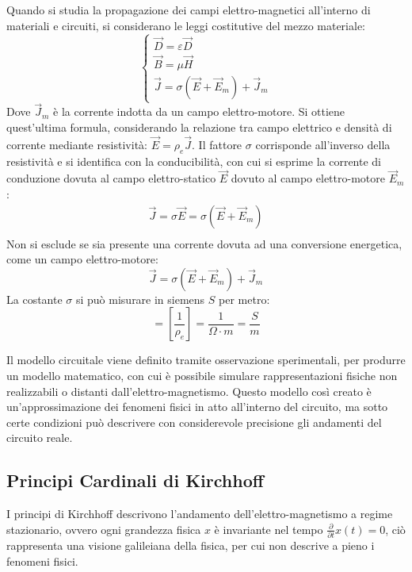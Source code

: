 \documentclass{article}
\numberwithin{equation}{subsection}
\begin{document}
Quando si studia la propagazione dei campi elettro-magnetici all'interno di materiali e circuiti, si considerano le leggi costitutive del mezzo materiale:
\begin{equation}
    \begin{cases}
        \vec{D}=\varepsilon\vec{D}\\
        \vec{B}=\mu\vec{H}\\
        \vec{J}=\sigma(\vec{E}+\vec{E}_m)+\vec{J}_m
    \end{cases}
\end{equation}
Dove $\vec{J}_m$ è la corrente indotta da un campo elettro-motore. Si ottiene quest'ultima formula, considerando la relazione tra campo elettrico e densità di corrente mediante 
resistività: $\vec{E}=\rho_e\vec{J}$. Il fattore $\sigma$ corrisponde all'inverso della resistività e si identifica con la conducibilità, con cui si esprime la corrente di conduzione dovuta al campo elettro-statico 
$\vec{E}$ dovuto al campo elettro-motore $\vec{E}_m$:  
\begin{gather*}
    \vec{J}=\sigma\vec{E}=\sigma(\vec{E}+\vec{E}_m)\\
\end{gather*}
Non si esclude se sia presente una corrente dovuta ad una conversione energetica, come un campo elettro-motore:
\begin{equation*}
    \vec{J}=\sigma(\vec{E}+\vec{E}_m)+\vec{J}_m
\end{equation*}
La costante $\sigma$ si può misurare in siemens $S$ per metro:
\begin{equation*}
    [\sigma]=\displaystyle\left[\frac{1}{\rho_e}\right]=\frac{1}{\Omega\cdot m}=\frac{S}{m}
\end{equation*}

Il modello circuitale viene definito tramite osservazione sperimentali, per produrre un modello matematico, con cui è possibile simulare rappresentazioni fisiche non realizzabili 
o distanti dall'elettro-magnetismo. Questo modello così creato è un'approssimazione dei fenomeni fisici in atto all'interno del circuito, ma sotto certe condizioni può 
descrivere con considerevole precisione gli andamenti del circuito reale. 

\subsection{Principi Cardinali di Kirchhoff}

I principi di Kirchhoff descrivono l'andamento dell'elettro-magnetismo a regime stazionario, ovvero ogni grandezza fisica $x$ è invariante nel tempo
$\displaystyle\frac{\partial }{\partial t}x(t)=0$, ciò rappresenta una visione galileiana della fisica, per cui non descrive a pieno i fenomeni fisici. 
\end{document}
